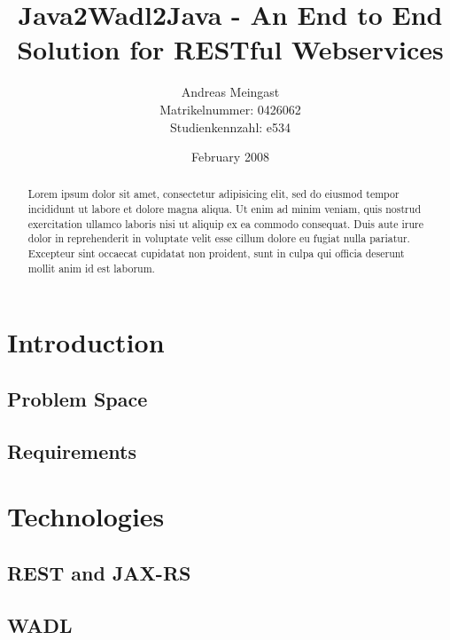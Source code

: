 \documentclass[a4paper,11pt]{article}
\begin{document}
\title{Java2Wadl2Java - An End to End Solution for RESTful Webservices}
\author{Andreas Meingast
	\\Matrikelnummer: 0426062
	\\Studienkennzahl: e534}

\date{February 2008}

\maketitle

\vspace{7cm}

\begin{abstract}
Lorem ipsum dolor sit amet, consectetur adipisicing elit, sed do eiusmod tempor incididunt ut labore et dolore magna aliqua. Ut enim ad minim veniam, quis nostrud exercitation ullamco laboris nisi ut aliquip ex ea commodo consequat. Duis aute irure dolor in reprehenderit in voluptate velit esse cillum dolore eu fugiat nulla pariatur. Excepteur sint occaecat cupidatat non proident, sunt in culpa qui officia deserunt mollit anim id est laborum.
\end{abstract}

\newpage

\tableofcontents

\newpage



\section{Introduction}

\subsection{Problem Space}

\subsection{Requirements}

\section{Technologies}

\subsection{REST and JAX-RS}

\subsection{WADL}
\end{document}
